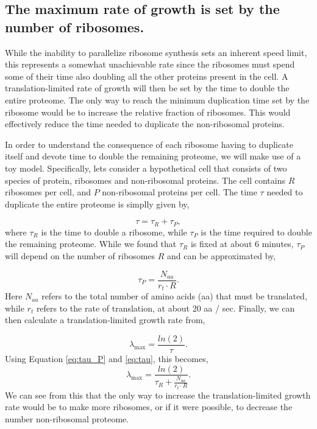 \documentclass[11pt, letterpaper]{article}
\begin{document}
\subsection{The maximum rate of growth is set by the number of
ribosomes.}

While the inability to parallelize ribosome synthesis sets an inherent speed
limit, this represents a somewhat unachievable rate since the ribosomes must
spend some of their time also doubling all the other proteins present in the
cell. A translation-limited rate of growth will then be set by the time to
double the entire proteome. The only way to reach the minimum duplication time
set by the ribosome would be to increase the relative fraction of ribosomes.
This would effectively reduce the time needed to duplicate the non-ribosomal
proteins.

In order to understand the consequence of each ribosome having to duplicate
itself and devote time to double the remaining proteome, we will make use of a
toy model. Specifically, lets consider a hypothetical cell that consists of two
species of protein, ribosomes and non-ribosomal proteins. The cell contains $R$
ribosomes per cell, and $P$ non-ribosomal proteins per cell. The time $\tau$
needed to duplicate the entire proteome is simplly given by,

\begin{equation}
	\tau = \tau_R + \tau_P,
\label{eq:tau}
\end{equation}
where $\tau_R$ is the time to double a ribosome, while $\tau_P$ is the time
required to double the remaining proteome. While we found that $\tau_R$ is fixed
at about 6 minutes,  $\tau_P$  will depend on the number of ribosomes $R$ and
can be approximated by,

\begin{equation}
\tau_P = \frac{N_{aa}}{r_t \cdot R}.
\label{eq:tau_P}
\end{equation}
Here $N_{aa}$ refers to the total number of amino acids (aa) that must be translated,
while $r_t$ refers to the rate of translation, at about 20 aa /
sec. Finally, we can then calculate a translation-limited growth rate from,

\begin{equation}
\lambda_{\text{max}} =  \frac{ln(2)} {\tau}.
\end{equation}
Using Equation \ref{eq:tau_P} and \ref{eq:tau}, this becomes,
\begin{equation}
\lambda_{\text{max}} =  \frac{ln(2)} {\tau_R + \frac{N_{aa}}{r_t \cdot R}}.
\label{eq:lambda_max}
\end{equation}
 We can see from this that the only way to increase the translation-limited
growth rate would be to make more ribosomes, or if it were possible, to decrease the
number non-ribosomal proteome.
\end{document}
